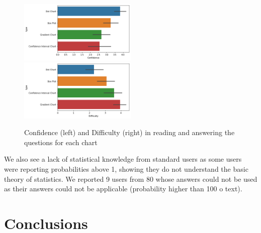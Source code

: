 \documentclass[a4paper,3p,sort&compress]{elsarticle}
\begin{document}
\begin{figure}
  \centering
   \includegraphics[width=0.5\textwidth]{confidence}  
   \includegraphics[width=0.5\textwidth]{difficulty}
  \caption{\label{figure:confi_load}Confidence (left) and Difficulty (right) in reading and answering the questions for each chart}
\end{figure}

We also see a lack of statistical knowledge from standard users as some users were reporting probabilities above 1, showing they do not understand the basic theory of statistics. We reported 9 users from 80 whose answers could not be used as their answers could not be applicable (probability higher than 100 o text).

\section{Conclusions}
\label{sec:concl}


\end{document}
